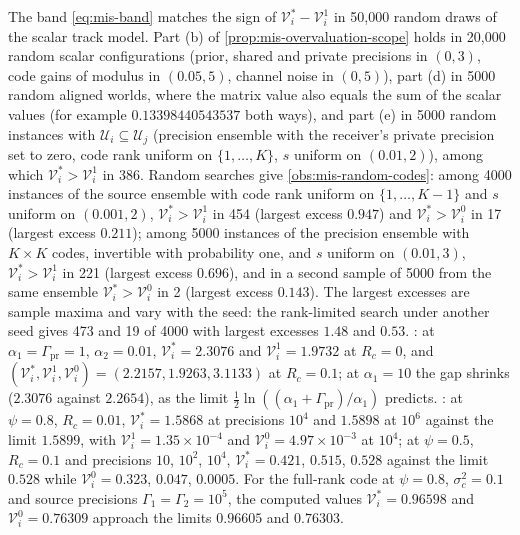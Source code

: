 \begin{numcheck}\label{chk:mis-scope}
The band \eqref{eq:mis-band} matches the sign of $\mathcal V^\ast_i-\mathcal V^1_i$ in 50{,}000 random draws of the scalar track model. Part (b) of \cref{prop:mis-overvaluation-scope} holds in 20{,}000 random scalar configurations (prior, shared and private precisions in $(0,3)$, code gains of modulus in $(0.05,5)$, channel noise in $(0,5)$), part (d) in 5000 random aligned worlds, where the matrix value also equals the sum of the scalar values (for example $0.13398440543537$ both ways), and part (e) in 5000 random instances with $\mathcal U_i\subseteq\mathcal U_j$ (precision ensemble with the receiver's private precision set to zero, code rank uniform on $\{1,\dots,K\}$, $s$ uniform on $(0.01,2)$), among which $\mathcal V^\ast_i>\mathcal V^1_i$ in 386. Random searches give \cref{obs:mis-random-codes}: among 4000 instances of the source ensemble with code rank uniform on $\{1,\dots,K-1\}$ and $s$ uniform on $(0.001,2)$, $\mathcal V^\ast_i>\mathcal V^1_i$ in 454 (largest excess $0.947$) and $\mathcal V^\ast_i>\mathcal V^0_i$ in 17 (largest excess $0.211$); among 5000 instances of the precision ensemble with $K\times K$ codes, invertible with probability one, and $s$ uniform on $(0.01,3)$, $\mathcal V^\ast_i>\mathcal V^1_i$ in 221 (largest excess $0.696$), and in a second sample of 5000 from the same ensemble $\mathcal V^\ast_i>\mathcal V^0_i$ in 2 (largest excess $0.143$). The largest excesses are sample maxima and vary with the seed: the rank-limited search under another seed gives 473 and 19 of 4000 with largest excesses $1.48$ and $0.53$. : at $\alpha_1=\Gamma_{\mathrm{pr}}=1$, $\alpha_2=0.01$, $\mathcal V^\ast_i=2.3076$ and $\mathcal V^1_i=1.9732$ at $R_c=0$, and $(\mathcal V^\ast_i,\mathcal V^1_i,\mathcal V^0_i)=(2.2157,1.9263,3.1133)$ at $R_c=0.1$; at $\alpha_1=10$ the gap shrinks ($2.3076$ against $2.2654$), as the limit $\tfrac12\ln((\alpha_1+\Gamma_{\mathrm{pr}})/\alpha_1)$ predicts. : at $\psi=0.8$, $R_c=0.01$, $\mathcal V^\ast_i=1.5868$ at precisions $10^4$ and $1.5898$ at $10^6$ against the limit $1.5899$, with $\mathcal V^1_i=1.35\times10^{-4}$ and $\mathcal V^0_i=4.97\times10^{-3}$ at $10^4$; at $\psi=0.5$, $R_c=0.1$ and precisions $10$, $10^2$, $10^4$, $\mathcal V^\ast_i=0.421$, $0.515$, $0.528$ against the limit $0.528$ while $\mathcal V^0_i=0.323$, $0.047$, $0.0005$. For the full-rank code at $\psi=0.8$, $\sigma_c^2=0.1$ and source precisions $\Gamma_1=\Gamma_2=10^5$, the computed values $\mathcal V^\ast_i=0.96598$ and $\mathcal V^0_i=0.76309$ approach the limits $0.96605$ and $0.76303$.
\end{numcheck}

